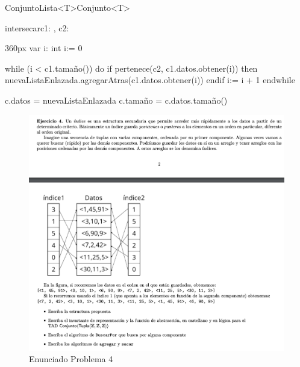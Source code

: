 \documentclass[10pt,a4paper]{article}
\begin{document}
\begin{ModuloImplements}{ConjuntoLista<T>}{Conjunto<T>}
\begin{proc}{intersecar}{\Inout c1: , \In c2: }{}
\begin{ImplementationCode}{360px}
      var i: int
          i:= 0
      
      while (i < c1.tamaño()) do
        if pertenece(c2, c1.datos.obtener(i)) then
          nuevaListaEnlazada.agregarAtras(c1.datos.obtener(i))
        endif
        i:= i + 1
      endwhile

      c.datos = nuevaListaEnlazada
      c.tamaño = c.datos.tamaño()
    \end{ImplementationCode}
  \end{proc}
\end{ModuloImplements}

\newpage
{}

\begin{figure}[h]
  \centering
  \includegraphics[width=\textwidth]{images/nuevo_ejercicio_4.png}
  \caption{Enunciado Problema 4}
  \label{fig:ej_4}
\end{figure}
\end{document}
